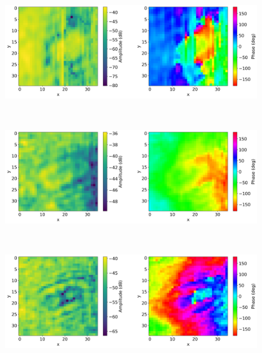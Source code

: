 \documentclass[11pt,a4paper,uplatex]{ujarticle}
\begin{document}
  \begin{figure}[tbp]
    \begin{minipage}[b]{0.995\textwidth}
      \centering
      \includegraphics[keepaspectratio, width=140mm]{Images/python/yokonarabe/019/50.png}
    \end{minipage}\\
    \begin{minipage}[b]{0.995\textwidth}
      \centering
      \includegraphics[keepaspectratio, width=140mm]{Images/python/yokonarabe/019/90.png}
    \end{minipage}\\
    \begin{minipage}[b]{0.995\textwidth}
      \centering
      \includegraphics[keepaspectratio, width=140mm]{Images/python/yokonarabe/019/130.png}
    \end{minipage}\\
    \begin{minipage}[b]{0.995\textwidth}

\end{minipage}
\end{figure}
\end{document}
